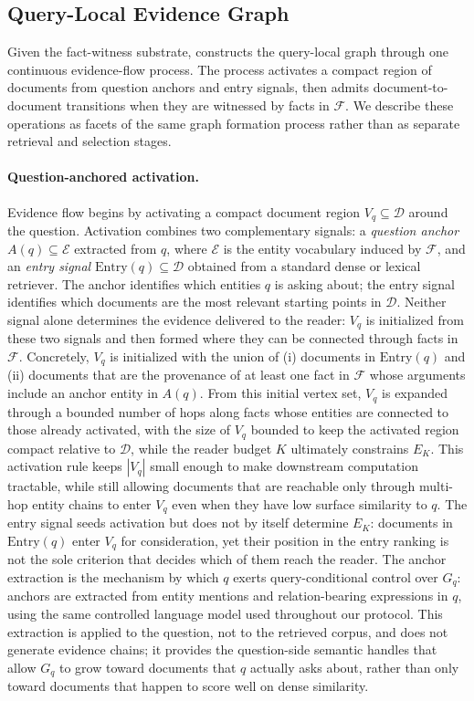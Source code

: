 \subsection{Query-Local Evidence Graph}
\label{sec:method:flow}

Given the fact-witness substrate, \methodname{} constructs the query-local
graph through one continuous evidence-flow process. The process activates a
compact region of documents from question anchors and entry signals, then
admits document-to-document transitions when they are witnessed by facts in
$\mathcal{F}$. We describe these operations as facets of the same graph
formation process rather than as separate retrieval and selection stages.

\paragraph{Question-anchored activation.}
\label{sec:method:anchor}
Evidence flow begins by activating a compact document region
$V_q \subseteq \mathcal{D}$ around the question. Activation combines two
complementary signals: a \emph{question anchor} $A(q) \subseteq \mathcal{E}$
extracted from $q$, where $\mathcal{E}$ is the entity vocabulary induced by
$\mathcal{F}$, and an \emph{entry signal} $\mathrm{Entry}(q) \subseteq
\mathcal{D}$ obtained from a standard dense or lexical retriever. The
anchor identifies which entities $q$ is asking about; the entry signal
identifies which documents are the most relevant starting points in
$\mathcal{D}$. Neither signal alone determines the evidence delivered to
the reader: $V_q$ is initialized from these two signals and then formed
where they can be connected through facts in $\mathcal{F}$. Concretely,
$V_q$ is initialized with the union of (i) documents in $\mathrm{Entry}(q)$
and (ii) documents that are the provenance of at least one fact in
$\mathcal{F}$ whose arguments include an anchor entity in $A(q)$. From this
initial vertex set, $V_q$ is expanded through a bounded number of hops
along facts whose entities are connected to those already activated, with
the size of $V_q$ bounded to keep the activated region compact relative to
$\mathcal{D}$, while the reader budget $K$ ultimately constrains $E_K$.
This activation rule keeps $|V_q|$ small enough to make downstream
computation tractable, while still allowing documents that are reachable
only through multi-hop entity chains to enter $V_q$ even when they have
low surface similarity to $q$. The entry signal seeds activation but does
not by itself determine $E_K$: documents in $\mathrm{Entry}(q)$ enter
$V_q$ for consideration, yet their position in the entry ranking is not
the sole criterion that decides which of them reach the reader. The anchor
extraction is the mechanism by which $q$ exerts query-conditional control
over $G_q$: anchors are extracted from entity mentions and relation-bearing
expressions in $q$, using the same controlled language model used
throughout our protocol. This extraction is applied to the question, not
to the retrieved corpus, and does not generate evidence chains; it provides
the question-side semantic handles that allow $G_q$ to grow toward
documents that $q$ actually asks about, rather than only toward documents
that happen to score well on dense similarity.

